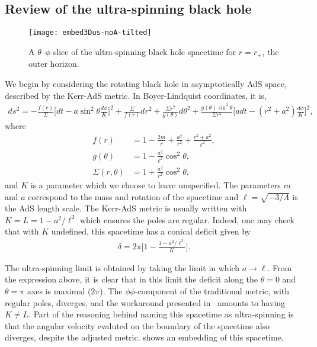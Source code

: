 \documentclass[
twoside,openright,frontopenright]{dmathesis}
\newcommand{\nn}{\nonumber}
\begin{document}
\subsection{Review of the ultra-spinning black hole}

\begin{figure}
  \centering
  \texttt{[image: embed3Dus-noA-tilted]}
  \caption{\label{fig:embed3Dus-noA-tilted}A $\theta$--$\phi$ slice of the
    ultra-spinning black hole spacetime for $r=r_+$, the outer horizon.}
\end{figure}

We begin by considering the rotating black hole in asymptotically AdS space,
described by the Kerr-AdS metric. In Boyer-Lindquist coordinates, it is, 
\begin{align} \label{eq:KerrAdS}
ds^2 = -\frac{f(r)}{\Sigma}\Big[dt-a\sin^2\theta \frac{d\phi}{K} \Big]^2 +
  \frac{\Sigma}{f(r)}dr^2 + \frac{\Sigma r^2}{g(\theta)}d\theta^2 +
  \frac{g(\theta) \sin^2\theta}{\Sigma r^2} \Big[adt-(r^2+a^2)
  \frac{d\phi}{K}\Big]^2, 
\end{align}
where
\begin{align}
f(r)&= 1-\frac{2 m}{r}+\frac{a^2}{r^2}+\frac{r^2+a^2}{\ell^2},\nn\\
g(\theta)&=1 - \frac{a^2}{\ell^2} \cos^2\theta, \nn\\
\Sigma(r, \theta) &= 1 + \frac{a^2}{r^2} \cos^2\theta,
\end{align}
and $K$ is a parameter which we choose to leave unspecified. The parameters $m$
and $a$ correspond to the mass and rotation of the spacetime and
$\ell = \sqrt{-3/\Lambda}$ is the AdS length scale. The Kerr-AdS metric is
usually written with $K = L = 1-a^2/\ell^2$ which ensures the poles are
regular. Indeed, one may check that with $K$ undefined, this spacetime has a
conical deficit given by
\begin{align}\label{eq:deficit-al}
\delta = 2\pi \bigg[1-\frac{1-a^{2}/\ell^{2}}{K}\bigg].
\end{align}

The ultra-spinning limit is obtained by taking the limit in which
$a\to\ell$. From the expression above, it is clear that in this limit the
deficit along the $\theta = 0$ and $\theta=\pi$ axes is maximal ($2\pi$). The
$\phi\phi$-component of the traditional metric, with regular poles, diverges,
and the workaround presented in~\cite{Hennigar:2014cfa} amounts to having
$K\neq L$. Part of the reasoning behind naming this spacetime as ultra-spinning
is that the angular velocity evaluted on the boundary of the spacetime also
diverges, despite the adjusted metric.  shows an
embedding of this spacetime.
\end{document}
